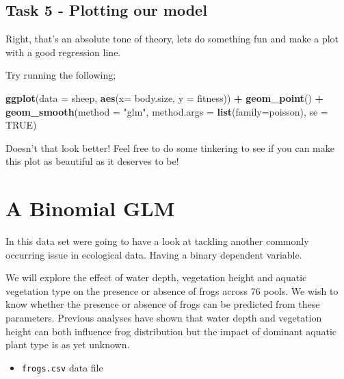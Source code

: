 \documentclass[
]{book}
\newenvironment{Shaded}{\begin{snugshade}}{\end{snugshade}}
\newcommand{\AttributeTok}[1]{\textcolor[rgb]{0.13,0.29,0.53}{#1}}
\newcommand{\ConstantTok}[1]{\textcolor[rgb]{0.56,0.35,0.01}{#1}}
\newcommand{\FunctionTok}[1]{\textcolor[rgb]{0.13,0.29,0.53}{\textbf{#1}}}
\newcommand{\NormalTok}[1]{#1}
\newcommand{\SpecialCharTok}[1]{\textcolor[rgb]{0.81,0.36,0.00}{\textbf{#1}}}
\newcommand{\StringTok}[1]{\textcolor[rgb]{0.31,0.60,0.02}{#1}}
\providecommand{\tightlist}{%
  \setlength{\itemsep}{0pt}\setlength{\parskip}{0pt}}
\begin{document}
\hypertarget{task-5---plotting-our-model}{%
\subsection{Task 5 - Plotting our model}\label{task-5---plotting-our-model}}

Right, that's an absolute tone of theory, lets do something fun and make a plot with a good regression line.

Try running the following;

\begin{Shaded}
\begin{Highlighting}[]
\FunctionTok{ggplot}\NormalTok{(}\AttributeTok{data =}\NormalTok{ sheep, }\FunctionTok{aes}\NormalTok{(}\AttributeTok{x=}\NormalTok{ body.size, }\AttributeTok{y =}\NormalTok{ fitness)) }\SpecialCharTok{+}
  \FunctionTok{geom\_point}\NormalTok{() }\SpecialCharTok{+}
  \FunctionTok{geom\_smooth}\NormalTok{(}\AttributeTok{method =} \StringTok{"glm"}\NormalTok{, }\AttributeTok{method.args =} \FunctionTok{list}\NormalTok{(}\AttributeTok{family=}\NormalTok{poisson), }\AttributeTok{se =} \ConstantTok{TRUE}\NormalTok{)}
\end{Highlighting}
\end{Shaded}

Doesn't that look better! Feel free to do some tinkering to see if you can make this plot as beautiful as it deserves to be!

\hypertarget{a-binomial-glm}{%
\section{A Binomial GLM}\label{a-binomial-glm}}

In this data set were going to have a look at tackling another commonly occurring issue in ecological data. Having a binary dependent variable.

We will explore the effect of water depth, vegetation height and aquatic vegetation type on the presence or absence of frogs across 76 pools. We wish to know whether the presence or absence of frogs can be predicted from these parameters. Previous analyses have shown that water depth and vegetation height can both influence frog distribution but the impact of dominant aquatic plant type is as yet unknown.

\begin{itemize}
\tightlist
\item
  \texttt{frogs.csv} data file
\end{itemize}
\end{document}
